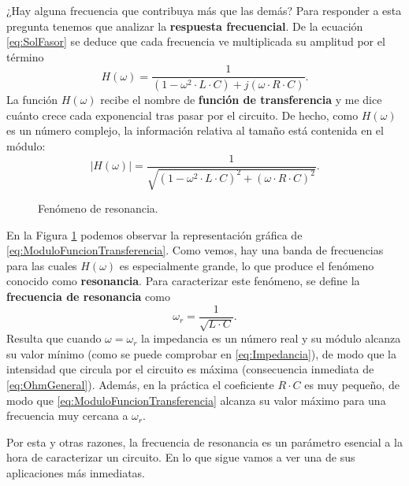 ¿Hay alguna frecuencia que contribuya más que las demás? Para responder a esta pregunta tenemos que analizar la \textbf{respuesta frecuencial}. De la ecuación \eqref{eq:SolFasor} se deduce que cada frecuencia ve multiplicada su amplitud por el término
\begin{equation}
  \label{eq:FuncionTransferencia}
  H(\omega) = \frac{1}{(1-\omega^2 \cdot L\cdot C) + j(\omega \cdot R\cdot C)}.
\end{equation}
La función $H(\omega)$ recibe el nombre de \textbf{función de transferencia} y me dice cuánto crece cada exponencial tras pasar por el circuito. De hecho, como $H(\omega)$ es un número complejo, la información relativa al tamaño está contenida en el módulo:
\begin{equation}
  \label{eq:ModuloFuncionTransferencia}
  \left|H(\omega)\right| = \frac{1}{\sqrt{(1-\omega^2\cdot L\cdot C)^2 + (\omega \cdot R\cdot C)^2}}.
\end{equation}

\begin{figure}
\begin{figurebox}
    \vspace{5pt}
    \centering
    \scalebox{0.4}{ }
    \vspace{-10pt}
    \caption{Fenómeno de resonancia.}
    \label{fig:Resonancia}
\end{figurebox}
\end{figure}


En la Figura \ref{fig:Resonancia} podemos observar la representación gráfica de \eqref{eq:ModuloFuncionTransferencia}. Como vemos, hay una banda de frecuencias para las cuales $H(\omega)$ es especialmente grande, lo que produce el fenómeno conocido como \textbf{resonancia}. Para caracterizar este fenómeno, se define la \textbf{frecuencia de resonancia} como
\begin{equation}
  \label{eq:FrecuenciaNatural}
  \omega_r = \frac{1}{\sqrt{L\cdot C}}.
\end{equation}
Resulta que cuando $\omega=\omega_r$ la impedancia es un número real y su módulo alcanza su valor mínimo (como se puede comprobar en \eqref{eq:Impedancia}), de modo que la intensidad que circula por el circuito es máxima (consecuencia inmediata de \eqref{eq:OhmGeneral}). Además, en la práctica el coeficiente $R\cdot C$ es muy pequeño, de modo que \eqref{eq:ModuloFuncionTransferencia} alcanza su valor máximo para una frecuencia muy cercana a $\omega_r$.

Por esta y otras razones, la frecuencia de resonancia es un parámetro esencial a la hora de caracterizar un circuito. En lo que sigue vamos a ver una de sus aplicaciones más inmediatas.


